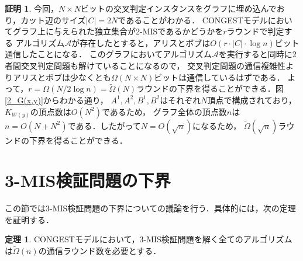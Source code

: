 \documentclass[12pt]{thesis}
\newcommand{\CONGEST}{\textsf{CONGEST}}
\theoremstyle{definition}
\newtheorem{theorem}{定理}[chapter]
\newtheorem*{prf*}{証明}
\begin{document}
\begin{prf*}
今回，$N \times N$ビットの交叉判定インスタンスをグラフに埋め込んでおり，カット辺のサイズ$|C| = 2N$であることがわかる．
{\CONGEST}モデルにおいてグラフ上に与えられた独立集合が2-MISであるかどうかを$r$ラウンドで判定する
アルゴリズム$\mathcal{A}$が存在したとすると，アリスとボブは$O(r \cdot |C| \cdot \log n)$ビット通信したことになる．
このグラフにおいてアルゴリズム$\mathcal{A}$を実行すると同時に2者間交叉判定問題も解けていることになるので，
交叉判定問題の通信複雑性よりアリスとボブは少なくとも$\Omega (N \times N)$ビットは通信しているはずである．
よって，$r = \Omega (N / 2\log n) = \tilde{\Omega}(N)$ラウンドの下界を得ることができる．図\ref{2_G(x,y)}からわかる通り，
$A^{1}, A^{2}, B^{1}, B^{2}$はそれぞれ$N$頂点で構成されており，$K_{W(y)}$の頂点数は$O(N^{2})$であるため，
グラフ全体の頂点数$n$は$n = O(N + N^{2})$である．したがって$N = O(\sqrt{n})$になるため，
$\tilde{\Omega}(\sqrt{n})$ラウンドの下界を得ることができる．
\end{prf*}
\newpage

\section{3-MIS検証問題の下界}
この節では3-MIS検証問題の下界についての議論を行う．具体的には，次の定理を証明する．
\begin{theorem}
{\CONGEST}モデルにおいて，3-MIS検証問題を解く全てのアルゴリズムは$\tilde{\Omega} (n)$の通信ラウンド数を必要とする．
\end{theorem}
\end{document}

